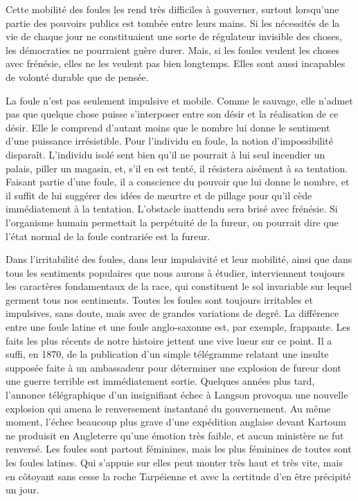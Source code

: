\documentclass[french,twoside]{book} %
\begin{document}
Cette mobilité des foules les rend très difficiles à gouverner, surtout lorsqu’une partie des pouvoirs publics est tombée entre leurs mains. Si les nécessités de la vie de chaque jour ne constituaient une sorte de régulateur invisible des choses, les démo­craties ne pourraient guère durer. Mais, si les foules veulent les choses avec frénésie, elles ne les veulent pas bien longtemps. Elles sont aussi incapables de volonté durable que de pensée.\par
La foule n’est pas seulement impulsive et mobile. Comme le sauvage, elle n’admet pas que quelque chose puisse s’interposer entre son désir et la réalisation de ce désir. Elle le comprend d’autant moins que le nombre lui donne le sentiment d’une puissance irrésistible. Pour l’individu en foule, la notion d’impossibilité disparaît. L’individu isolé sent bien qu’il ne pourrait à lui seul incendier un palais, piller un magasin, et, s’il en est tenté, il résistera aisément à sa tentation. Faisant partie d’une foule, il a con­science du pouvoir que lui donne le nombre, et il suffit de lui suggérer des idées de meurtre et de pillage pour qu’il cède immédiatement à la tentation. L’obstacle inatten­du sera brisé avec frénésie. Si l’organisme humain permettait la perpétuité de la fureur, on pourrait dire que l’état normal de la foule contrariée est la fureur.\par
Dans l’irritabilité des foules, dans leur impulsivité et leur mobilité, ainsi que dans tous les sentiments populaires que nous aurons à étudier, interviennent toujours les caractères fondamentaux de la race, qui constituent le sol invariable sur lequel ger­ment tous nos sentiments. Toutes les foules sont toujours irritables et impulsives, sans doute, mais avec de grandes variations de degré. La différence entre une foule latine et une foule anglo-saxonne est, par exemple, frappante. Les faits les plus récents de notre histoire jettent une vive lueur sur ce point. Il a suffi, en 1870, de la publication d’un simple télégramme relatant une insulte supposée faite à un ambassadeur pour déterminer une explosion de fureur dont une guerre terrible est immédiate­ment sortie. Quelques années plus tard, l’annonce télé­graphique d’un insignifiant échec à Langson provoqua une nouvelle explosion qui amena le renversement instantané du gouvernement. Au même moment, l’échec beaucoup plus grave d’une expédition anglaise devant Kartoum ne produisit en Angleterre qu’une émotion très faible, et aucun ministère ne fut renversé. Les foules sont partout féminines, mais les plus féminines de toutes sont les foules latines. Qui s’appuie sur elles peut monter très haut et très vite, mais en côtoyant sans cesse la roche Tarpéienne et avec la certitude d’en être précipité un jour.
\end{document}
